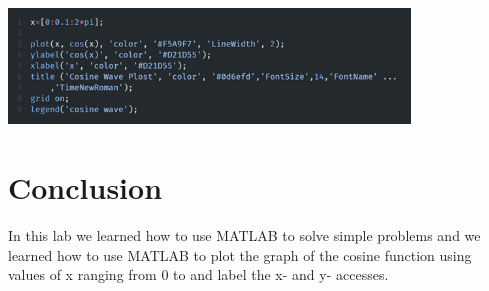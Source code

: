 \documentclass[12pt,a4paper]{article}
\begin{document}
\begin{enumerate}
\includegraphics[width=0.8\textwidth]{images/Picture7.png}~\\[3cm]
\end{enumerate}

\section{Conclusion}
In this lab we learned how to use MATLAB to solve simple problems and we learned how to use MATLAB to plot the graph of the cosine function using values of x ranging from 0 to and label the x- and y- accesses.

\end{document}

